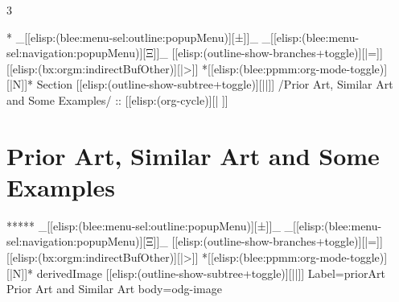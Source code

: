 \begin{whenOrg}
\begin{verblatex}
\begin{frame}[fragile,plain,label=ScopeOfBleeLcnt]
\begin{multicols}{3}
    \end{multicols}



\end{frame}
\end{verblatex}



\begin{whenOrg}
*  _[[elisp:(blee:menu-sel:outline:popupMenu)][±]]_ _[[elisp:(blee:menu-sel:navigation:popupMenu)][Ξ]]_ [[elisp:(outline-show-branches+toggle)][|=]] [[elisp:(bx:orgm:indirectBufOther)][|>]] *[[elisp:(blee:ppmm:org-mode-toggle)][|N]]*  Section    [[elisp:(outline-show-subtree+toggle)][||]]   /Prior Art, Similar Art and Some Examples/ ::  [[elisp:(org-cycle)][| ]]
\end{whenOrg}

\section{Prior Art, Similar Art and Some Examples}


\begin{whenOrg}
*****  _[[elisp:(blee:menu-sel:outline:popupMenu)][±]]_ _[[elisp:(blee:menu-sel:navigation:popupMenu)][Ξ]]_ [[elisp:(outline-show-branches+toggle)][|=]] [[elisp:(bx:orgm:indirectBufOther)][|>]] *[[elisp:(blee:ppmm:org-mode-toggle)][|N]]*  derivedImage [[elisp:(outline-show-subtree+toggle)][||]] Label=priorArt Prior Art and Similar Art body=odg-image
\end{whenOrg}


\end{whenOrg}
